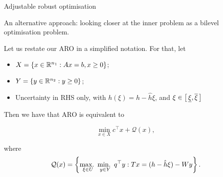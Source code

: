 \begin{frame}{Adjustable robust optimisation}
	
	An \alert{alternative} approach: looking closer at the inner problem as a \alert{bilevel} optimisation problem.
	
	Let us restate our ARO in a simplified notation. For that, let
	\vspace{-6pt} 
	\begin{itemize}
		\item $X = \left\{ x \in \mathbb R^{n_1} : Ax = b, x \ge 0 \right \}$;
		\item $Y = \left\{ y \in \mathbb R^{n_2} : y \ge 0 \right \}$;
		\item Uncertainty in \alert{RHS only}, with $h(\xi) = h - \hat{h}\xi$, and $\xi \in \left[ \, \underline{\xi}, \overline{\xi}\, \right]$
	\end{itemize} 
	
	\pause
	Then we have that ARO is equivalent to
	
	\begin{equation} \tag{ARO}
		\min_{x \in X} c^\top x + \mathcal{Q}(x),
	\end{equation}

	where
	\begin{equation*}
		\mathcal{Q}(x) = \left\{ \mathop{\text{max.} \ }_{\xi \in U}\mathop{\text{min.} \ }_{y \in Y} q^\top y : Tx =(h - \hat{h}\xi) - Wy \right \}.
	\end{equation*}
	
\end{frame}


